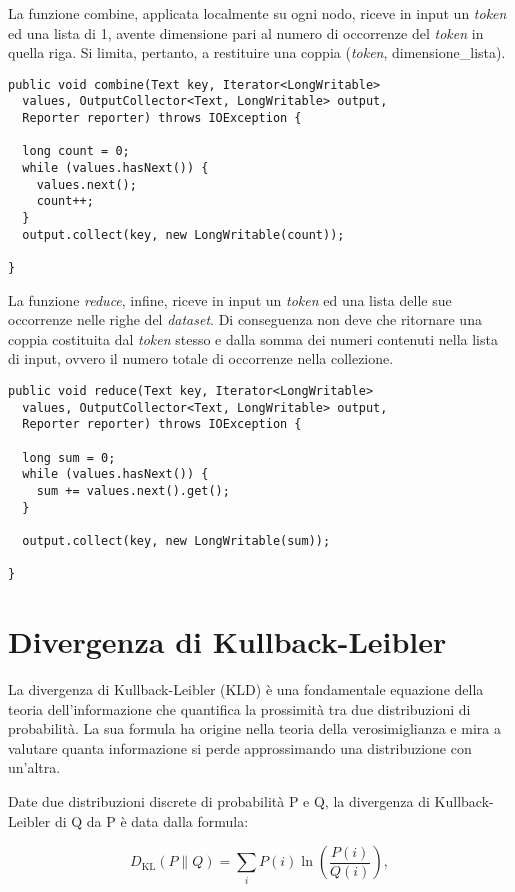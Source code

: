 La funzione combine, applicata localmente su ogni nodo, riceve in input un \textit{token} ed una lista di 1, avente dimensione pari al numero di occorrenze del \textit{token} in quella riga. 
Si limita, pertanto, a restituire una coppia (\textit{token}, dimensione\_lista).

\begin{lstlisting}[frame=single]
public void combine(Text key, Iterator<LongWritable> 
  values, OutputCollector<Text, LongWritable> output, 
  Reporter reporter) throws IOException {

  long count = 0;
  while (values.hasNext()) {
    values.next();
    count++;
  }
  output.collect(key, new LongWritable(count));

}
\end{lstlisting}

La funzione \textit{reduce}, infine, riceve in input un \textit{token} ed una lista delle sue occorrenze nelle righe del \textit{dataset}.
Di conseguenza non deve che ritornare una coppia costituita dal \textit{token} stesso e dalla somma dei numeri contenuti nella lista di input, ovvero il numero totale di occorrenze nella collezione.

\begin{lstlisting}[frame=single]
public void reduce(Text key, Iterator<LongWritable> 
  values, OutputCollector<Text, LongWritable> output, 
  Reporter reporter) throws IOException {

  long sum = 0;
  while (values.hasNext()) {
    sum += values.next().get();
  }

  output.collect(key, new LongWritable(sum));
  
}
\end{lstlisting}


\section{Divergenza di Kullback-Leibler}
\label{par:KLD}

La divergenza di Kullback-Leibler (KLD) è una fondamentale equazione della teoria dell’informazione che quantifica la prossimità tra due distribuzioni di probabilità. La sua formula ha origine 
nella teoria della verosimiglianza e mira a valutare quanta informazione si perde approssimando una distribuzione con un’altra. 

Date due distribuzioni discrete di probabilità P e Q, la divergenza di Kullback-Leibler di Q da P è data dalla formula:

\begin{equation} \label{eq:1}
D_{\mathrm{KL}}(P\|Q) = \sum_i P(i) \ln\left(\frac{P(i)}{Q(i)}\right),
\end{equation}

